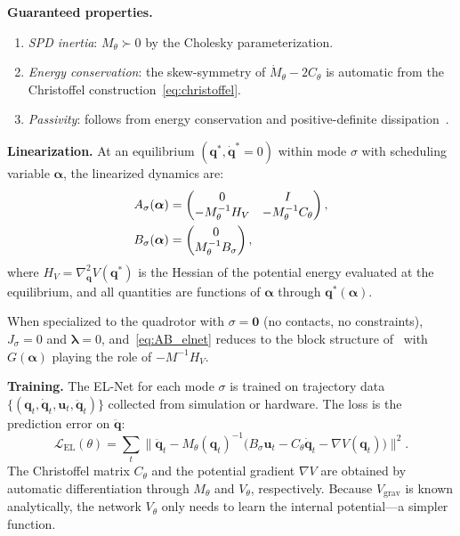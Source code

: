 \documentclass[letterpaper, 10pt, conference]{IEEEtran}
\newcommand{\balpha}{\bm{\alpha}}
\newcommand{\bu}{\bm{u}}
\newcommand{\bq}{\bm{q}}
\begin{document}
\textbf{Guaranteed properties.}
\begin{enumerate}
  \item \emph{SPD inertia}: $M_\theta \succ 0$ by the
    Cholesky parameterization.
  \item \emph{Energy conservation}: the skew-symmetry of
    $\dot{M}_\theta - 2 C_\theta$ is automatic from the
    Christoffel construction~\eqref{eq:christoffel}.
  \item \emph{Passivity}: follows from energy conservation
    and positive-definite dissipation~\cite{lutter2019}.
\end{enumerate}

\textbf{Linearization.}
At an equilibrium $(\bq^*, \dot{\bq}^* = 0)$ within
mode $\sigma$ with scheduling variable $\balpha$,
the linearized dynamics are:
\begin{align}\label{eq:AB_elnet}
  A_\sigma(\balpha)
  &= \begin{pmatrix}
      0 & I \\
      -M_\theta^{-1} H_V & -M_\theta^{-1} C_\theta
    \end{pmatrix}, \notag \\
  B_\sigma(\balpha)
  &= \begin{pmatrix}
      0 \\
      M_\theta^{-1} B_\sigma
    \end{pmatrix},
\end{align}
where $H_V = \nabla^2_{\bq} V(\bq^*)$ is the Hessian of the
potential energy evaluated at the equilibrium,
and all quantities are functions of $\balpha$ through $\bq^*(\balpha)$.

When specialized to the quadrotor with $\sigma = \bm{0}$
(no contacts, no constraints), $J_\sigma = 0$ and
$\bm{\lambda} = 0$, and~\eqref{eq:AB_elnet} reduces to
the block structure of~\cite[Eq.~(5)]{zhang2025flat}
with $G(\balpha)$ playing the role of $-M^{-1} H_V$.

\textbf{Training.}
The EL-Net for each mode $\sigma$ is trained on trajectory data
$\{(\bq_t, \dot{\bq}_t, \bu_t, \ddot{\bq}_t)\}$ collected
from simulation or hardware.
The loss is the prediction error on $\ddot{\bq}$:
\begin{equation}\label{eq:elnet_loss}
  \mathcal{L}_{\mathrm{EL}}(\theta)
  = \sum_t \bigl\|
      \ddot{\bq}_t - M_\theta(\bq_t)^{-1}
      \bigl( B_\sigma \bu_t - C_\theta \dot{\bq}_t
             - \nabla V(\bq_t) \bigr)
    \bigr\|^2.
\end{equation}
The Christoffel matrix $C_\theta$ and the potential gradient
$\nabla V$ are obtained by automatic differentiation through
$M_\theta$ and $V_\theta$, respectively.
Because $V_{\mathrm{grav}}$ is known analytically, the network
$V_\theta$ only needs to learn the internal potential---a
simpler function.
\end{document}
